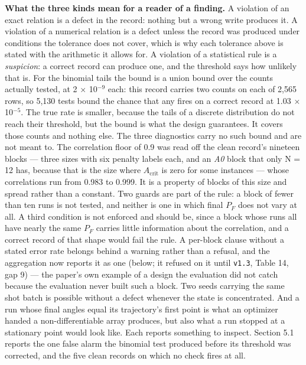 \documentclass[acmsmall,screen,review]{acmart}
\begin{document}
\textbf{What the three kinds mean for a reader of a finding.} A violation of an exact relation is a defect in the record: nothing but a wrong write produces it. A violation of a numerical relation is a defect unless the record was produced under conditions the tolerance does not cover, which is why each tolerance above is stated with the arithmetic it allows for. A violation of a statistical rule is a \textit{suspicion}: a correct record can produce one, and the threshold says how unlikely that is. For the binomial tails the bound is a union bound over the counts actually tested, at 2 $\times$ 10$^{-9}$ each: this record carries two counts on each of 2,565 rows, so 5,130 tests bound the chance that any fires on a correct record at 1.03 $\times$ 10$^{-5}$. The true rate is smaller, because the tails of a discrete distribution do not reach their threshold, but the bound is what the design guarantees. It covers those counts and nothing else. The three diagnostics carry no such bound and are not meant to. The correlation floor of 0.9 was read off the clean record's nineteen blocks --- three sizes with six penalty labels each, and an \textit{A0} block that only N = 12 has, because that is the size where $A_{\mathrm{crit}}$ is zero for some instances --- whose correlations run from 0.983 to 0.999. It is a property of blocks of this size and spread rather than a constant. Two guards are part of the rule: a block of fewer than ten runs is not tested, and neither is one in which final $P_{F}$ does not vary at all. A third condition is not enforced and should be, since a block whose runs all have nearly the same $P_{F}$ carries little information about the correlation, and a correct record of that shape would fail the rule. A per-block clause without a stated error rate belongs behind a warning rather than a refusal, and the aggregation now reports it as one (below; it refused on it until \texttt{v1.3}, Table 14, gap 9) --- the paper's own example of a design the evaluation did not catch because the evaluation never built such a block. Two seeds carrying the same shot batch is possible without a defect whenever the state is concentrated. And a run whose final angles equal its trajectory's first point is what an optimizer handed a non-differentiable array produces, but also what a run stopped at a stationary point would look like. Each reports something to inspect. Section 5.1 reports the one false alarm the binomial test produced before its threshold was corrected, and the five clean records on which no check fires at all.
\end{document}

